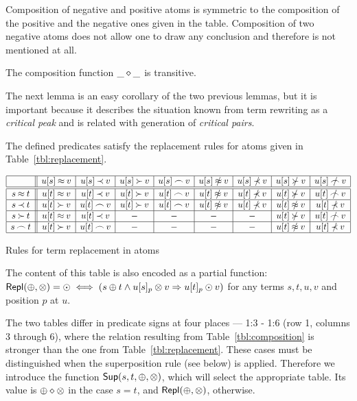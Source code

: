 Composition of negative and positive atoms is symmetric to the composition
of the positive and the negative ones given in the table. Composition of
two negative atoms does not allow one to draw any conclusion and therefore
is not mentioned at all.
%
\begin{LEMMA} \label {le:composition-transitivity}
The composition function \(\_\diamond\_\) is transitive. 
\end{LEMMA}
%
The next lemma is an easy corollary of the two previous lemmas, 
but it is important because it describes the situation known from 
term rewriting as a {\em critical peak} \cite{Der} and is related 
with generation of {\em critical pairs}.
%
\begin{LEMMA} \label{le:replacement-in-atoms}
The defined predicates satisfy the replacement rules for atoms given in
Table~\ref {tbl:replacement}.\vspace{-2ex}
\begin{table}[hbt]
\[\begin{array}{|c||c|c|c|c|c|c|c|c|}
\hline
          & u[s]\Eq v   & u[s]\Incl v & u[s]\Cont v & u[s]\Int v & u[s]\notEq v & u[s]\notIncl v & u[s]\notCont v & u[s]\notInt v\\
\hline
\hline
s\Eq t    & u[t]\Eq v   & u[t]\Incl v & u[t]\Cont v & u[t]\Int v & u[t]\notEq v & u[t]\notIncl v & u[t]\notCont v & u[t]\notInt v\\
\hline
s\Incl t  & u[t]\Cont v & u[t]\Int v  & u[t]\Cont v & u[t]\Int v & u[t]\notEq v & u[t]\notIncl v & u[t]\notEq v & u[t]\notIncl v \\
\hline
s\Cont t  & u[t]\Eq v & u[t]\Incl v & -  & - & -  & - & u[t]\notCont v & u[t]\notInt v \\
\hline
s\Int t   & u[t]\Cont v & u[t]\Int v  & -  & - & -  & -  & u[t]\notEq v & u[t]\notIncl v \\
\hline 
\end{array}\]
\caption{Rules for term replacement in atoms} 
\label{tbl:replacement}\vspace{-3ex}
\end{table}
\end{LEMMA}

The content of this table is also encoded as a partial function:
\(\mbox{\sf Repl}(\oplus,\otimes)=\odot\iff(s\oplus t\land u[s]_p\otimes v\mathrel\Rightarrow u[t]_p\odot v)\) 
for any terms $s,t,u,v$ and position $p$ at $u$.

The two tables differ in predicate signs at four places --- 1:3 - 1:6
(row 1, columns 3 through 6), where the relation resulting from
Table~\ref{tbl:composition} is stronger than the one from
Table~\ref{tbl:replacement}.  These cases must be distinguished when the 
superposition rule (see below) is applied. Therefore we introduce the
function \(\mbox{\sf Sup}(s,t,\oplus,\otimes)\), which will select the appropriate
table. Its 
value is \(\oplus\diamond\otimes\) in the
case \(s=t\), and \(\mbox{\sf Repl}(\oplus,\otimes)\), otherwise.

